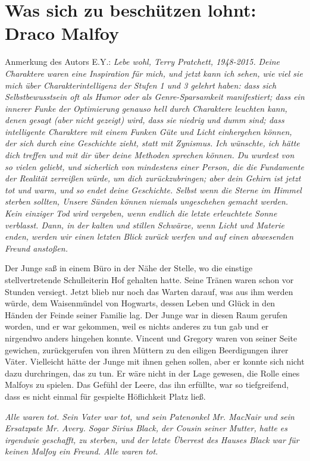 \chapter{Was sich zu beschützen lohnt: Draco Malfoy}

Anmerkung des Autors E.Y.:
\emph{Lebe wohl, Terry Pratchett, 1948-2015.}
\emph{Deine Charaktere waren eine Inspiration für mich, und jetzt kann ich
sehen, wie viel sie mich über Charakterintelligenz der Stufen 1 und 3 gelehrt
haben: dass sich Selbstbewusstsein oft als Humor oder als Genre-Sparsamkeit
manifestiert; dass ein innerer Funke der Optimierung genauso hell durch
Charaktere leuchten kann, denen gesagt (aber nicht gezeigt) wird, dass sie
niedrig und dumm sind; dass intelligente Charaktere mit einem Funken Güte und
Licht einhergehen können, der sich durch eine Geschichte zieht, statt mit
Zynismus. Ich wünschte, ich hätte dich treffen und mit dir über deine Methoden
sprechen können. Du wurdest von so vielen geliebt, und sicherlich von mindestens
einer Person, die die Fundamente der Realität zerreißen würde, um dich
zurückzubringen; aber dein Gehirn ist jetzt tot und warm, und so endet deine
Geschichte. Selbst wenn die Sterne im Himmel sterben sollten, Unsere Sünden
können niemals ungeschehen gemacht werden. Kein einziger Tod wird vergeben, wenn
endlich die letzte erleuchtete Sonne verblasst. Dann, in der kalten und stillen
Schwärze, wenn Licht und Materie enden, werden wir einen letzten Blick zurück
werfen und auf einen abwesenden Freund anstoßen.}

Der Junge saß in einem Büro in der Nähe der Stelle, wo die einstige
stellvertretende Schulleiterin Hof gehalten hatte. Seine Tränen waren schon vor
Stunden versiegt. Jetzt blieb nur noch das Warten darauf, was aus ihm werden
würde, dem Waisenmündel von Hogwarts, dessen Leben und Glück in den Händen der
Feinde seiner Familie lag. Der Junge war in diesen Raum gerufen worden, und er
war gekommen, weil es nichts anderes zu tun gab und er nirgendwo anders hingehen
konnte. Vincent und Gregory waren von seiner Seite gewichen, zurückgerufen von
ihren Müttern zu den eiligen Beerdigungen ihrer Väter. Vielleicht hätte der
Junge mit ihnen gehen sollen, aber er konnte sich nicht dazu durchringen, das zu
tun. Er wäre nicht in der Lage gewesen, die Rolle eines Malfoys zu spielen. Das
Gefühl der Leere, das ihn erfüllte, war so tiefgreifend, dass es nicht einmal
für gespielte Höflichkeit Platz ließ.

\emph{Alle waren tot. Sein Vater war tot, und sein Patenonkel Mr. MacNair und
sein Ersatzpate Mr. Avery. Sogar Sirius Black, der Cousin seiner Mutter, hatte
es irgendwie geschafft, zu sterben, und der letzte Überrest des Hauses Black war
für keinen Malfoy ein Freund. Alle waren tot.}

